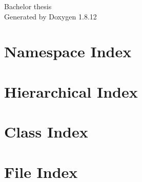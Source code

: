 \documentclass[twoside]{book}
\newcommand{\+}{\discretionary{\mbox{\scriptsize$\hookleftarrow$}}{}{}}
\newcommand{\clearemptydoublepage}{%
  \newpage{\pagestyle{empty}\cleardoublepage}%
}
\begin{document}
\hypersetup{pageanchor=false,
             bookmarksnumbered=true,
             pdfencoding=unicode
            }
\begin{titlepage}
\vspace*{7cm}
\begin{center}%
{\Large Bachelor thesis }\\
\vspace*{1cm}
{\large Generated by Doxygen 1.8.12}\\
\end{center}
\end{titlepage}
\clearemptydoublepage
{}
\tableofcontents
\clearemptydoublepage
{}
\hypersetup{pageanchor=true}

\chapter{Namespace Index}

\chapter{Hierarchical Index}

\chapter{Class Index}

\chapter{File Index}

\end{document}
